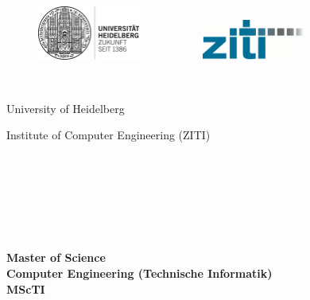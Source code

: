 


%


\thispagestyle{empty}


\begin{figure}[t]
 \centering
 \includegraphics[width=0.3\textwidth]{abb/hd_logo_small_sw_16cm_rgb}
~~~~~~~~~~
 \includegraphics[width=0.3\textwidth]{abb/ziti-logo_150}
\end{figure}


\begin{verbatim}


\end{verbatim}

\begin{center}
\Large{University of Heidelberg}\\
\end{center}


\begin{center}
\Large{Institute of Computer Engineering (ZITI)}
\end{center}
\begin{verbatim}




\end{verbatim}
\begin{center}
\doublespacing
\textbf{\LARGE{\titleDocument}}\\
\singlespacing
\begin{verbatim}

\end{verbatim}
\textbf{Master of Science}\\
\textbf{Computer Engineering (Technische Informatik)}\\
\textbf{MScTI}
\end{center}
\begin{verbatim}

\end{verbatim}
\begin{center}

\end{center}


